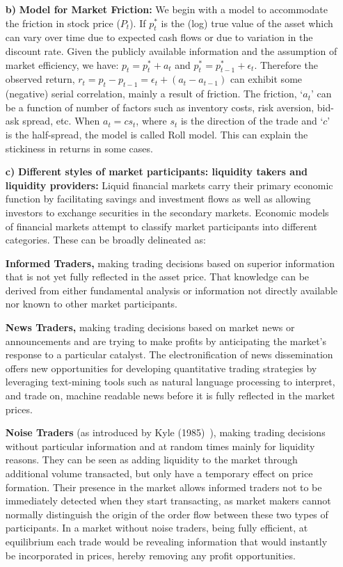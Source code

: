 \begin{enumerate}
\item[\textbf{b)}] {\bfseries Model for Market Friction:} We begin with a model to accommodate the friction in stock price ($P_t$). If $p_t^*$ is the (log) true value of the asset which can vary over time due to expected cash flows or due to variation in the discount rate. Given the publicly available information and the assumption of market efficiency, we have: $p_t= p_t^* + a_t$ and $p_t^*= p_{t-1}^* + \epsilon_t$. Therefore the observed return, $r_t= p_t - p_{t-1}= \epsilon_t + (a_t - a_{t-1})$ can exhibit some (negative) serial correlation, mainly a result of friction. The friction, `$a_t$' can be a function of number of factors such as inventory costs, risk aversion, bid-ask spread, etc. When $a_t= c s_t$, where $s_t$ is the direction of the trade and `$c$' is the half-spread, the model is called Roll model. This can explain the stickiness in returns in some cases.  

\item[\textbf{c)}] {\bfseries Different styles of market participants: liquidity takers and liquidity providers:} Liquid financial markets carry their primary economic function by facilitating savings and investment flows as well as allowing investors to exchange securities in the secondary markets. Economic models of financial markets attempt to classify market participants into different categories. These can be broadly delineated as: \twomedskip

{\bfseries Informed Traders,} making trading decisions based on superior information that is not yet fully reflected in the asset price. That knowledge can be derived from either fundamental analysis or information not directly available nor known to other market participants. \twomedskip

{\bfseries News Traders,} making trading decisions based on market news or announcements and are trying to make profits by anticipating the market's response to a particular catalyst. The electronification of news dissemination offers new opportunities for developing quantitative trading strategies by leveraging text-mining tools such as natural language processing to interpret, and trade on, machine readable news before it is fully reflected in the market prices. %
 \twomedskip

{\bfseries Noise Traders} (as introduced by Kyle (1985)~\cite{kyle1985}), making trading decisions without particular information and at random times mainly for liquidity reasons. They can be seen as adding liquidity to the market through additional volume transacted, but only have a temporary effect on price formation. Their presence in the market allows informed traders not to be immediately detected when they start transacting, as market makers cannot normally distinguish the origin of the order flow between these two types of participants. In a market without noise traders, being fully efficient, at equilibrium each trade would be revealing information that would instantly be incorporated in prices, hereby removing any profit opportunities. \twomedskip


\end{enumerate}
